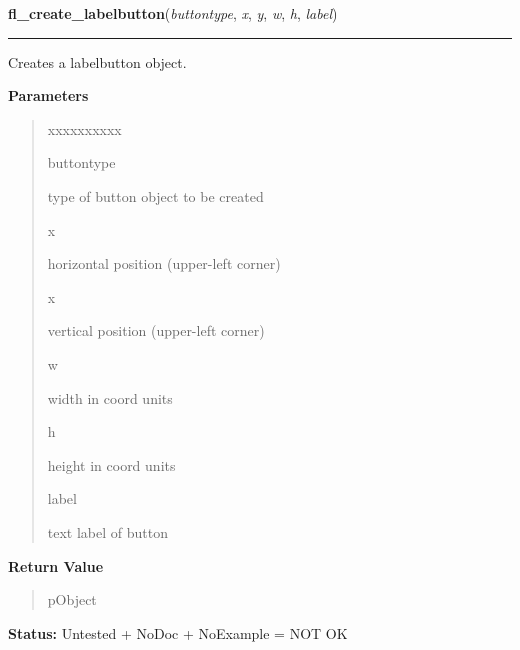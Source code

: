     \label{xformslib:library:fl_create_labelbutton}

    \vspace{0.5ex}

\hspace{.8\funcindent}\begin{boxedminipage}{\funcwidth}

    \raggedright \textbf{fl\_create\_labelbutton}(\textit{buttontype}, \textit{x}, \textit{y}, \textit{w}, \textit{h}, \textit{label})

    \vspace{-1.5ex}

    \rule{\textwidth}{0.5\fboxrule}
\setlength{\parskip}{2ex}
    Creates a labelbutton object.

\setlength{\parskip}{1ex}
      \textbf{Parameters}
      \vspace{-1ex}

      \begin{quote}
        \begin{Ventry}{xxxxxxxxxx}

          \item[buttontype]

          type of button object to be created

          \item[x]

          horizontal position (upper-left corner)

          \item[x]

          vertical position (upper-left corner)

          \item[w]

          width in coord units

          \item[h]

          height in coord units

          \item[label]

          text label of button

        \end{Ventry}

      \end{quote}

      \textbf{Return Value}
    \vspace{-1ex}

      \begin{quote}
      pObject

      \end{quote}

\textbf{Status:} Untested + NoDoc + NoExample = NOT OK



    \end{boxedminipage}

